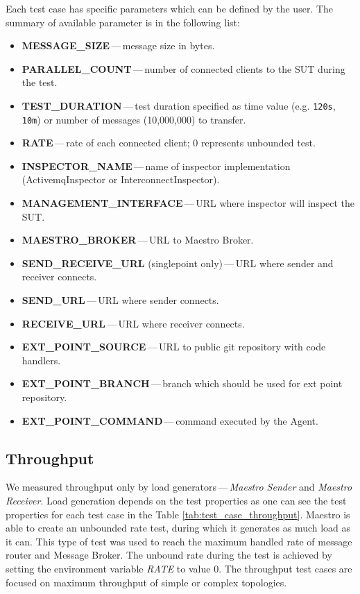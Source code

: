 Each test case has specific parameters which can be defined by the user. The summary of available parameter is in the following list:
\begin{itemize}
	\setlength\itemsep{0em}
	\item \textbf{MESSAGE\_SIZE}\,---\,message size in bytes.
	\item \textbf{PARALLEL\_COUNT}\,---\,number of connected clients to the SUT during the test.
	\item \textbf{TEST\_DURATION}\,---\,test duration specified as time value (e.g. \texttt{120s}, \texttt{10m}) or number of messages (10,000,000) to transfer.
	\item \textbf{RATE}\,---\,rate of each connected client; 0 represents unbounded test.
	\item \textbf{INSPECTOR\_NAME}\,---\,name of inspector implementation (ActivemqInspector or InterconnectInspector).
	\item \textbf{MANAGEMENT\_INTERFACE}\,---\,URL where inspector will inspect the SUT.
	\item \textbf{MAESTRO\_BROKER}\,---\,URL to Maestro Broker.
	\item \textbf{SEND\_RECEIVE\_URL} (singlepoint only)\,---\,URL where sender and receiver connects.
	\item \textbf{SEND\_URL}\,---\,URL where sender connects.
	\item \textbf{RECEIVE\_URL}\,---\,URL where receiver connects.
	\item \textbf{EXT\_POINT\_SOURCE}\,---\,URL to public git repository with code handlers.
	\item \textbf{EXT\_POINT\_BRANCH}\,---\,branch which should be used for ext point repository.
	\item \textbf{EXT\_POINT\_COMMAND}\,---\,command executed by the Agent.
\end{itemize}

\subsection{Throughput}
\label{Throughput}
We measured throughput only by load generators\,---\,\emph{Maes\-tro Sender} and \emph{Maestro Receiver}. Load generation depends on the test properties as one can see the test properties for each test case in the Table \ref{tab:test_case_throughput}. Maestro is able to create an unbounded rate test, during which it generates as much load as it can. This type of test was used to reach the maximum handled rate of message router and Message Broker. The unbound rate during the test is achieved by setting the environment variable \emph{RATE} to value 0. The throughput test cases are focused on maximum throughput of simple or complex topologies.

